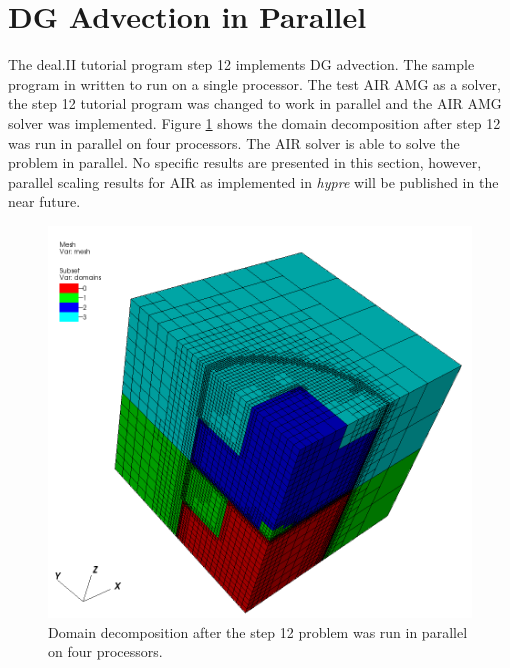 \documentclass[11pt]{article}
\begin{document}
\FloatBarrier
\section{DG Advection in Parallel}
The deal.II tutorial program step 12 implements DG advection. The sample program in written to run on a single processor. The test AIR AMG as a solver, the step 12 tutorial program was changed to work in parallel and the AIR AMG solver was implemented. Figure \ref{fig:step_12_domain_decomp} shows the domain decomposition after step 12 was run in parallel on four processors. The AIR solver is able to solve the problem in parallel. No specific results are presented in this section, however, parallel scaling results for AIR as implemented in \textit{hypre} will be published in the near future.

\begin{figure}[ht]
	\centering
	\includegraphics[scale=0.3]{./figures/step_12_parallel_domain_decomp.png}
	\caption{Domain decomposition after the step 12 problem was run in parallel on four processors.}
	\label{fig:step_12_domain_decomp}
\end{figure}
\end{document}
